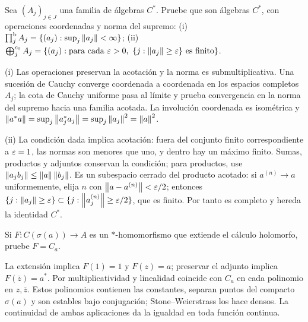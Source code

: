 \begin{ejercicio}\label{ej:v3-l25-8}
Sea $(A_j)_{j\in J}$ una familia de álgebras $C^*$. Pruebe que son álgebras $C^*$, con operaciones coordenadas y norma del supremo: (i) $\prod_j^{\mathrm b}A_j=\{(a_j):\sup_j\left\lVert a_j\right\rVert<\infty\}$; (ii) $\bigoplus_j^{c_0}A_j=\{(a_j):\text{para cada }\varepsilon>0,\ \{j:\left\lVert a_j\right\rVert\ge\varepsilon\}\text{ es finito}\}$.
\end{ejercicio}
\begin{solucion}
(i) Las operaciones preservan la acotación y la norma es submultiplicativa. Una sucesión de Cauchy converge coordenada a coordenada en los espacios completos $A_j$; la cota de Cauchy uniforme pasa al límite y prueba convergencia en la norma del supremo hacia una familia acotada. La involución coordenada es isométrica y
$\left\lVert a^*a\right\rVert=\sup_j\left\lVert a_j^*a_j\right\rVert=\sup_j\left\lVert a_j\right\rVert^2=\left\lVert a\right\rVert^2$.

(ii) La condición dada implica acotación: fuera del conjunto finito correspondiente a $\varepsilon=1$, las normas son menores que uno, y dentro hay un máximo finito. Sumas, productos y adjuntos conservan la condición; para productos, use $\left\lVert a_jb_j\right\rVert\le\left\lVert a\right\rVert\left\lVert b_j\right\rVert$. Es un subespacio cerrado del producto acotado: si $a^{(n)}\to a$ uniformemente, elija $n$ con $\left\lVert a-a^{(n)}\right\rVert<\varepsilon/2$; entonces $\{j:\left\lVert a_j\right\rVert\ge\varepsilon\}\subset\{j:\left\lVert a_j^{(n)}\right\rVert\ge\varepsilon/2\}$, que es finito. Por tanto es completo y hereda la identidad $C^*$.
\end{solucion}

\begin{ejercicio}\label{ej:v3-l26-1}
Si $F:C(\sigma(a))\to A$ es un $*$-homomorfismo que extiende el cálculo holomorfo, pruebe $F=C_a$.
\end{ejercicio}
\begin{solucion}
La extensión implica $F(1)=1$ y $F(z)=a$; preservar el adjunto implica $F(\overline z)=a^*$. Por multiplicatividad y linealidad coincide con $C_a$ en cada polinomio en $z,\overline z$. Estos polinomios contienen las constantes, separan puntos del compacto $\sigma(a)$ y son estables bajo conjugación; Stone--Weierstrass los hace densos. La continuidad de ambas aplicaciones da la igualdad en toda función continua.
\end{solucion}

